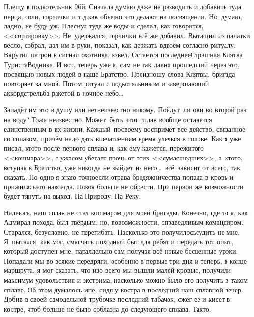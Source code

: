 Плещу в подкотельник 96\sdash й. Сначала думаю даже не разводить и добавить туда перца, соли, горчички и т.д.\mdash как обычно это делают на посвящении. Но~думаю, ладно, не буду уж. Плеснул туда же воды и сделал, как говорится, <<сортировку>>. Не~удержался, горчички всё же добавил. Вытащил из палатки весло, собрал, дал им в руки, показал, как держать вдвоём согласно ритуалу. Вкрутил патрон в сигнал охотника, взвёл. Остается последнее\mdash Страшная Клятва Туриста\sdash Водника. И вот, теперь уже я, сам не так давно прошедший через это, посвящаю новых людей в наше Братство. Произношу слова Клятвы, бригада повторяет за мной. Потом ритуал с подкотельником и завершающий аккорд\mdash стрельба ракетой в ночное небо\ldots~   

Западёт им это в душу или нет\mdash неизвестно никому. Пойдут~ли они во второй раз на воду? Тоже неизвестно. Может~быть этот сплав вообще останется единственным в их жизни. Каждый~по\sdash своему воспримет всё действо, связанное со сплавом, причём надо дать впечатлениям время улечься в голове. Как я уже писал, кто\sdash то после первого сплава и, как ему кажется, пережитого <<кошмара>>, с ужасом убегает прочь от этих <<сумасшедших>>, а~кто\sdash то, вступая в Братство, уже никогда не выйдет из него\ldots~всё~зависит от всего, так сказать. Но одно я знаю точно\mdash если отрава бродяжничества попала в кровь и прижилась\mdash это навсегда. Покоя больше не обрести. При первой же возможности будет тянуть на выход. На Природу. На Реку.

Надеюсь, наш сплав не стал кошмаром для моей бригады. Конечно, где то я, как Адмирал похода, был твёрдым, но, по\sdash возможности, справедливым командиром. Старался, безусловно, не перегибать. Насколько это получилось\mdash судить не мне. Я~пытался, как мог, смягчить походный быт для ребят и передать тот опыт, который доступен мне, параллельно сам получая всё новые бесценные уроки. Попадали мы во всякие передряги, особенно в первые три дня и теперь, в конце маршрута, я мог сказать, что изо всего мы вышли малой кровью, получили максимум удовольствия и экстрима, насколько можно было его получить в таком сплаве. Об этом думалось мне, сидя у костра в последний наш сплавной вечер. Добив в своей самодельной трубочке последний табачок, сжёг её и кисет в костре, чтоб больше не было соблазна до следующего сплава. Так\sdash то. 

\begin{center}
\end{center}